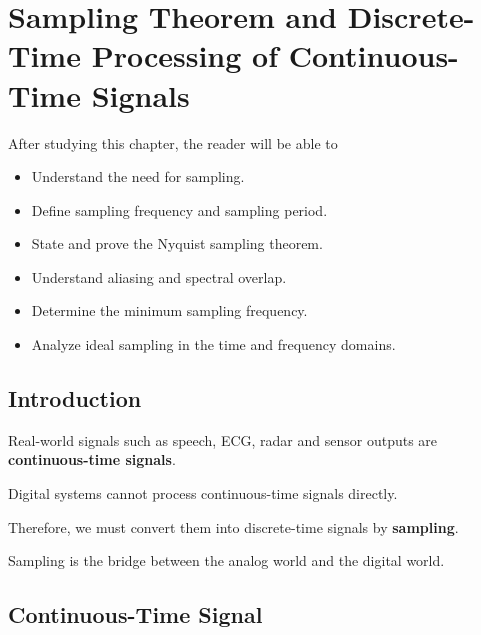 
\chapter{Sampling Theorem and Discrete-Time Processing of Continuous-Time Signals}

\begin{tcolorbox}[colback=blue!5!white,colframe=blue!70!black,title=Learning Objectives]

After studying this chapter, the reader will be able to

\begin{itemize}
\item Understand the need for sampling.
\item Define sampling frequency and sampling period.
\item State and prove the Nyquist sampling theorem.
\item Understand aliasing and spectral overlap.
\item Determine the minimum sampling frequency.
\item Analyze ideal sampling in the time and frequency domains.
\end{itemize}

\end{tcolorbox}


\section{Introduction}

Real-world signals such as speech, ECG, radar and sensor outputs are
\textbf{continuous-time signals}.

Digital systems cannot process continuous-time signals directly.

Therefore, we must convert them into discrete-time signals by
\textbf{sampling}.

Sampling is the bridge between the analog world and the digital world.


\section{Continuous-Time Signal}

